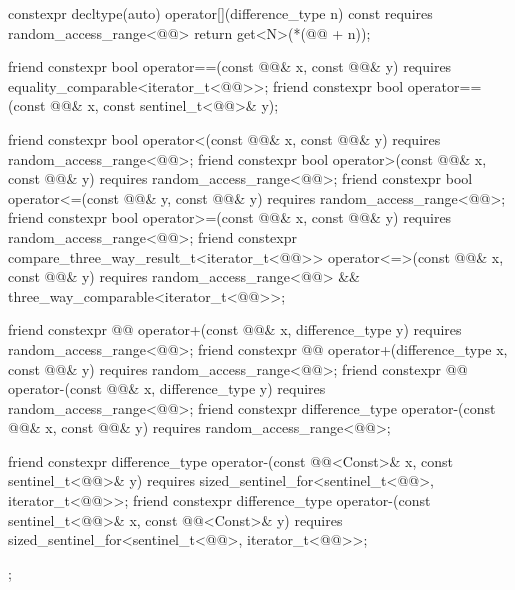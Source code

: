 \begin{codeblock}
{{    constexpr decltype(auto) operator[](difference_type n) const
      requires random_access_range<@@>
    { return get<N>(*(@@ + n)); }

    friend constexpr bool operator==(const @@& x, const @@& y)
      requires equality_comparable<iterator_t<@@>>;
    friend constexpr bool operator==(const @@& x, const sentinel_t<@@>& y);

    friend constexpr bool operator<(const @@& x, const @@& y)
      requires random_access_range<@@>;
    friend constexpr bool operator>(const @@& x, const @@& y)
      requires random_access_range<@@>;
    friend constexpr bool operator<=(const @@& y, const @@& y)
      requires random_access_range<@@>;
    friend constexpr bool operator>=(const @@& x, const @@& y)
      requires random_access_range<@@>;
    friend constexpr compare_three_way_result_t<iterator_t<@@>>
      operator<=>(const @@& x, const @@& y)
        requires random_access_range<@@> && three_way_comparable<iterator_t<@@>>;

    friend constexpr @@ operator+(const @@& x, difference_type y)
      requires random_access_range<@@>;
    friend constexpr @@ operator+(difference_type x, const @@& y)
      requires random_access_range<@@>;
    friend constexpr @@ operator-(const @@& x, difference_type y)
      requires random_access_range<@@>;
    friend constexpr difference_type operator-(const @@& x, const @@& y)
      requires random_access_range<@@>;

    friend constexpr difference_type
      operator-(const @@<Const>& x, const sentinel_t<@@>& y)
        requires sized_sentinel_for<sentinel_t<@@>, iterator_t<@@>>;
    friend constexpr difference_type
      operator-(const sentinel_t<@@>& x, const @@<Const>& y)
        requires sized_sentinel_for<sentinel_t<@@>, iterator_t<@@>>;
  };
}
\end{codeblock}

